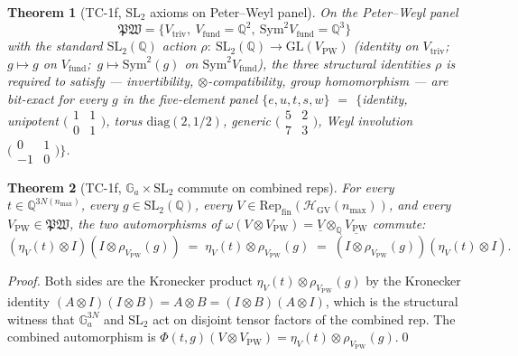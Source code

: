 \documentclass[11pt,a4paper]{article}
\theoremstyle{plain}
\newtheorem{theorem}{Theorem}[section]
\theoremstyle{definition}
\newcommand{\nmax}{n_{\max}}
\newcommand{\HGV}{\mathcal{H}_{\mathrm{GV}}}
\newcommand{\Repcat}{\mathrm{Rep}_{\mathrm{fin}}}
\newcommand{\GL}{\mathrm{GL}}
\newcommand{\SL}{\mathrm{SL}}
\newcommand{\Ga}{\mathbb{G}_{a}}
\newcommand{\Q}{\mathbb{Q}}
\newcommand{\Phimap}{\Phi}
\newcommand{\fibfun}{\omega}
\begin{document}
\begin{theorem}[TC-1f, $\SL_{2}$ axioms on Peter--Weyl panel]\label{thm:sl2_pw}
On the Peter--Weyl panel
\[
   \mathfrak{PW} = \bigl\{V_{\mathrm{triv}},\ V_{\mathrm{fund}} = \Q^{2},\ \mathrm{Sym}^{2} V_{\mathrm{fund}} = \Q^{3}\bigr\}
\]
with the standard $\SL_{2}(\Q)$ action
$\rho :\ \SL_{2}(\Q) \to \GL(V_{\mathrm{PW}})$ (identity on
$V_{\mathrm{triv}}$;\ $g \mapsto g$ on $V_{\mathrm{fund}}$;\
$g \mapsto \mathrm{Sym}^{2}(g)$ on $\mathrm{Sym}^{2} V_{\mathrm{fund}}$),
the three structural identities $\rho$ is required to satisfy ---
invertibility, $\otimes$-compatibility, group homomorphism --- are
bit-exact for every $g$ in the five-element panel $\{e, u, t, s, w\}$
$= $ $\{$identity, unipotent
$\bigl(\begin{smallmatrix} 1 & 1 \\ 0 & 1 \end{smallmatrix}\bigr)$,
torus $\mathrm{diag}(2, 1/2)$, generic
$\bigl(\begin{smallmatrix} 5 & 2 \\ 7 & 3 \end{smallmatrix}\bigr)$,
Weyl involution
$\bigl(\begin{smallmatrix} 0 & 1 \\ -1 & 0 \end{smallmatrix}\bigr)\}$.
\end{theorem}

\begin{theorem}[TC-1f, $\Ga \times \SL_{2}$ commute on combined reps]\label{thm:ga_sl2_commute}
For every $t \in \Q^{3 N(\nmax)}$, every $g \in \SL_{2}(\Q)$, every
$V \in \Repcat(\HGV(\nmax))$, and every $V_{\mathrm{PW}} \in
\mathfrak{PW}$, the two automorphisms of $\fibfun(V \otimes V_{\mathrm{PW}})
= \underline{V} \otimes_{\Q} \underline{V_{\mathrm{PW}}}$ commute:
\[
   (\eta_{V}(t) \otimes I)(I \otimes \rho_{V_{\mathrm{PW}}}(g))
   \;=\;
   \eta_{V}(t) \otimes \rho_{V_{\mathrm{PW}}}(g)
   \;=\;
   (I \otimes \rho_{V_{\mathrm{PW}}}(g))(\eta_{V}(t) \otimes I).
\]
\end{theorem}

\begin{proof}
Both sides are the Kronecker product $\eta_{V}(t) \otimes
\rho_{V_{\mathrm{PW}}}(g)$ by the Kronecker identity
$(A \otimes I)(I \otimes B) = A \otimes B = (I \otimes B)(A \otimes I)$,
which is the structural witness that $\Ga^{3 N}$ and $\SL_{2}$ act on
disjoint tensor factors of the combined rep. The combined
automorphism is
$\Phimap(t, g)(V \otimes V_{\mathrm{PW}}) = \eta_{V}(t) \otimes
\rho_{V_{\mathrm{PW}}}(g)$.\qed
\end{proof}
\end{document}
